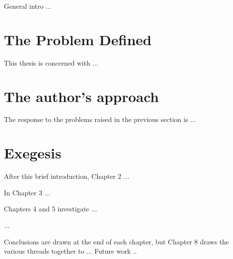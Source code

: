 

General intro ...

\section{The Problem Defined}
\label{sec:intro:problem}

This thesis is concerned with ...

\section{The author's approach}
\label{sec:intro:approach}

The response to the problems raised in the previous section is ...


\section{Exegesis}
\label{sec:intro:exegesis}

After this brief introduction, Chapter 2 ...

In Chapter 3 ...

Chapters 4 and 5 investigate ...

...

Conclusions are drawn at the end of each chapter,
but Chapter 8 draws the various threads together to ...
Future work ..


